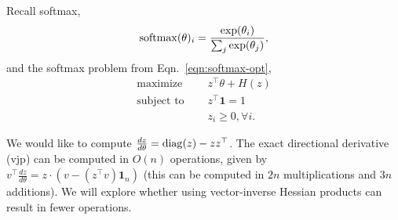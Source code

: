 \documentclass[11pt]{article}
\begin{document}
Recall softmax,
$$\mathrm{softmax}(\theta)_i = \frac{\exp(\theta_i)}{\sum_j \exp(\theta_j)},$$
and the softmax problem from Eqn.~\ref{eqn:softmax-opt},
\begin{equation}
\begin{aligned}
\textrm{maximize } \quad & z^\top\theta + H(z)\\
\textrm{subject to } \quad & z^\top \mathbf{1} = 1\\
& z_i \geq 0, \forall i.
\end{aligned}
\end{equation}

We would like to compute $\frac{dz}{d\theta} = \mathrm{diag}(z)-zz^\top$.
The exact directional derivative (vjp) can be computed in $O(n)$ operations,
given by $v^\top \frac{dz}{d\theta} = z \cdot (v - (z^\top v)\mathbf{1}_n)$
(this can be computed in $2n$ multiplications and $3n$ additions).
We will explore whether using vector-inverse Hessian products can result in fewer operations.
\end{document}
